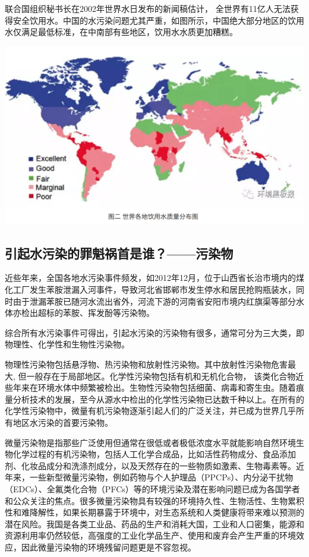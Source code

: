 \documentclass[]{book}
\begin{document}
联合国组织秘书长在2002年世界水日发布的新闻稿估计，
全世界有11亿人无法获得安全饮用水。中国的水污染问题尤其严重，如图所示，中国绝大部分地区的饮用水仅满足最低标准，在中南部有些地区，饮用水水质更加糟糕。

\includegraphics[width=8.33in]{images/dushui2}

\subsection{引起水污染的罪魁祸首是谁？------污染物}

近些年来，全国各地水污染事件频发，如2012年12月，位于山西省长治市境内的煤化工厂发生苯胺泄漏入河事件，导致河北省邯郸市发生停水和居民抢购瓶装水，同时由于泄漏苯胺已随河水流出省外，河流下游的河南省安阳市境内红旗渠等部分水体亦检出超标的苯胺、挥发酚等污染物。

综合所有水污染事件可得出，引起水污染的污染物有很多，通常可分为三大类，即物理性、化学性和生物性污染物。

物理性污染物包括悬浮物、热污染物和放射性污染物。其中放射性污染物危害最大,
但一般存在于局部地区。化学性污染物包括有机和无机化合物，
该类化合物近些年来在环境水体中频繁被检出。生物性污染物包括细菌、病毒和寄生虫。随着痕量分析技术的发展，至今从源水中检出的化学性污染物已达数千种以上。在所有的化学性污染物中，微量有机污染物逐渐引起人们的广泛关注，并已成为世界几乎所有地区水污染的首要污染物。

微量污染物是指那些广泛使用但通常在很低或者极低浓度水平就能影响自然环境生物化学过程的有机污染物，包括人工化学合成品，比如活性药物成分、食品添加剂、化妆品成分和洗涤剂成分，以及天然存在的一些物质如激素、生物毒素等。近年来，一些新型微量污染物，例如药物与个人护理品（PPCPs）、内分泌干扰物（EDCs）、全氟类化合物（PFCs）等的环境污染及潜在影响问题已成为各国学者和公众关注的焦点。很多微量污染物具有较强的环境持久性、生物活性、生物累积性和难降解性，如果长期暴露于环境中，对生态系统和人类健康将带来难以预测的潜在风险。我国是各类工业品、药品的生产和消耗大国，工业和人口密集，能源和资源利用率仍然较低，高强度的工业化学品生产、使用和废弃会产生严重的环境效应，因此微量污染物的环境残留问题更是不容忽视。
\end{document}
